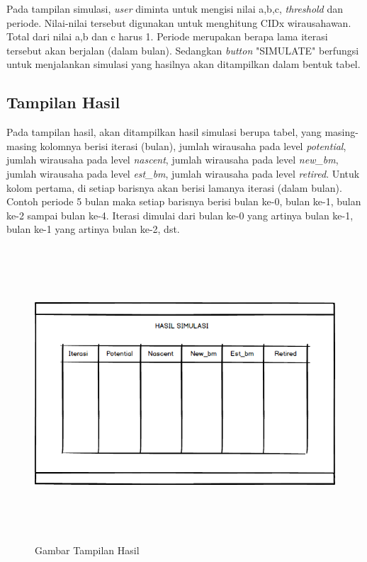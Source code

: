 Pada tampilan simulasi, \textit{user} diminta untuk mengisi nilai a,b,c, \textit{threshold} dan periode. Nilai-nilai tersebut digunakan untuk menghitung CIDx wirausahawan. Total dari nilai a,b dan c harus 1. Periode merupakan berapa lama iterasi tersebut akan berjalan (dalam bulan). Sedangkan \textit{button} "SIMULATE" berfungsi untuk menjalankan simulasi yang hasilnya akan ditampilkan dalam bentuk tabel.

\subsection{Tampilan Hasil}

Pada tampilan hasil, akan ditampilkan hasil simulasi berupa tabel, yang masing-masing kolomnya berisi iterasi (bulan), jumlah wirausaha pada level \textit{potential}, jumlah wirausaha pada level \textit{nascent}, jumlah wirausaha pada level \textit{new\_bm}, jumlah wirausaha pada level \textit{est\_bm}, jumlah wirausaha pada level \textit{retired}. Untuk kolom pertama, di setiap barisnya akan berisi lamanya iterasi (dalam bulan). Contoh periode 5 bulan maka setiap barisnya berisi bulan ke-0, bulan ke-1, bulan ke-2 sampai bulan ke-4. Iterasi dimulai dari bulan ke-0 yang artinya bulan ke-1, bulan ke-1 yang artinya bulan ke-2, dst.
\begin{figure} [H]
	\centering  
	\includegraphics[width=13cm, height=11cm]{mockup6} 
	\caption[Gambar Tampilan Hasil]{Gambar Tampilan Hasil}
	\label{fig:tampilanHasil} 
\end{figure}

